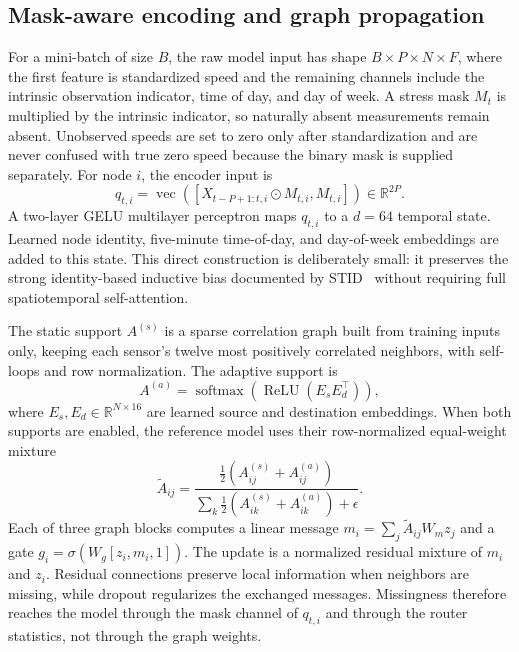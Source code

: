 \documentclass[preprint,12pt]{elsarticle}
\begin{document}
\subsection{Mask-aware encoding and graph propagation}
For a mini-batch of size $B$, the raw model input has shape
$B\times P\times N\times F$, where the first feature is standardized speed and
the remaining channels include the intrinsic observation indicator, time of
day, and day of week. A stress mask $M_t$ is multiplied by the intrinsic
indicator, so naturally absent measurements remain absent. Unobserved speeds
are set to zero only after standardization and are never confused with true
zero speed because the binary mask is supplied separately. For node $i$, the
encoder input is
\begin{equation}
 q_{t,i}=\operatorname{vec}\left([X_{t-P+1:t,i}\odot M_{t,i},M_{t,i}]\right)
 \in\mathbb{R}^{2P}.
\end{equation}
A two-layer GELU multilayer perceptron maps $q_{t,i}$ to a $d=64$ temporal
state. Learned node identity, five-minute time-of-day, and day-of-week
embeddings are added to this state. This direct construction is deliberately
small: it preserves the strong identity-based inductive bias documented by
STID~\cite{shao2022stid} without requiring full spatiotemporal self-attention.

The static support $A^{(s)}$ is a sparse correlation graph built from training
inputs only, keeping each sensor's twelve most positively correlated
neighbors, with self-loops and row normalization. The adaptive support is
\begin{equation}
 A^{(a)}=\operatorname{softmax}\!\left(\operatorname{ReLU}(E_sE_d^\top)\right),
\end{equation}
where $E_s,E_d\in\mathbb{R}^{N\times16}$ are learned source and destination
embeddings. When both supports are enabled, the reference model uses their
row-normalized equal-weight mixture
\begin{equation}
 \widetilde A_{ij}=
 \frac{\tfrac12(A^{(s)}_{ij}+A^{(a)}_{ij})}
 {\sum_k\tfrac12(A^{(s)}_{ik}+A^{(a)}_{ik})+\epsilon}.
\end{equation}
Each of three graph blocks computes a linear message
$m_i=\sum_j\widetilde A_{ij}W_mz_j$ and a gate $g_i=\sigma(W_g[z_i,m_i,1])$. The
update is a normalized residual mixture of $m_i$ and $z_i$. Residual
connections preserve local information when neighbors are missing, while
dropout regularizes the exchanged messages. Missingness therefore reaches the
model through the mask channel of $q_{t,i}$ and through the router statistics,
not through the graph weights.
\end{document}
